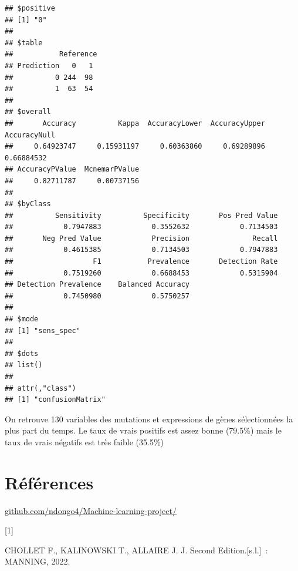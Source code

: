 \documentclass[
  12pt,
]{article}
\newlength{\cslhangindent}
\newlength{\csllabelwidth}
\newlength{\cslentryspacingunit} %
\newenvironment{CSLReferences}[2] %
 {%
  \setlength{\parindent}{0pt}
  \ifodd #1
  \let\oldpar\par
  \def\par{\hangindent=\cslhangindent\oldpar}
  \fi
  \setlength{\parskip}{#2\cslentryspacingunit}
 }%
 {}
\newcommand{\CSLLeftMargin}[1]{\parbox[t]{\csllabelwidth}{#1}}
\newcommand{\CSLRightInline}[1]{\parbox[t]{\linewidth - \csllabelwidth}{#1}\break}
\begin{document}
\begin{verbatim}
## $positive
## [1] "0"
## 
## $table
##           Reference
## Prediction   0   1
##          0 244  98
##          1  63  54
## 
## $overall
##       Accuracy          Kappa  AccuracyLower  AccuracyUpper   AccuracyNull 
##     0.64923747     0.15931197     0.60363860     0.69289896     0.66884532 
## AccuracyPValue  McnemarPValue 
##     0.82711787     0.00737156 
## 
## $byClass
##          Sensitivity          Specificity       Pos Pred Value 
##            0.7947883            0.3552632            0.7134503 
##       Neg Pred Value            Precision               Recall 
##            0.4615385            0.7134503            0.7947883 
##                   F1           Prevalence       Detection Rate 
##            0.7519260            0.6688453            0.5315904 
## Detection Prevalence    Balanced Accuracy 
##            0.7450980            0.5750257 
## 
## $mode
## [1] "sens_spec"
## 
## $dots
## list()
## 
## attr(,"class")
## [1] "confusionMatrix"
\end{verbatim}

On retrouve 130 variables des mutations et expressions de gènes
sélectionnées la plus part du temps. Le taux de vrais positifs est assez
bonne (79.5\%) mais le taux de vrais négatifs est très faible (35.5\%)

\hypertarget{ruxe9fuxe9rences}{%
\section{Références}\label{ruxe9fuxe9rences}}

\href{https://github.com/ndongo4/Machine-learning-project}{github.com/ndongo4/Machine-learning-project/}

\hypertarget{refs}{}
\begin{CSLReferences}{0}{1}
\leavevmode{}%
\CSLLeftMargin{{[}1{]} }%
\CSLRightInline{CHOLLET F., KALINOWSKI T., ALLAIRE J. J. Second
Edition.{[}s.l.{]}~: MANNING, 2022. }

\end{CSLReferences}
\end{document}
